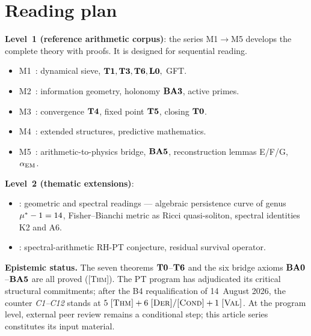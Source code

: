 \section{Reading plan}
\label{sec:plan}

\textbf{Level~1 (reference arithmetic corpus)}: the series M1$\to$M5 develops the complete theory with proofs. It is designed for sequential reading.
\begin{itemize}[nosep,leftmargin=*]
\item M1~\cite{companion_M1}: dynamical sieve, $\textbf{T1}, \textbf{T3}, \textbf{T6}, \textbf{L0},$ GFT.
\item M2~\cite{companion_M2}: information geometry, holonomy $\textbf{BA3}$, active primes.
\item M3~\cite{companion_M3}: convergence $\textbf{T4}$, fixed point $\textbf{T5}$, closing $\textbf{T0}$.
\item M4~\cite{companion_M4}: extended structures, predictive mathematics.
\item M5~\cite{companion_M5}: arithmetic-to-physics bridge, $\textbf{BA5}$, reconstruction lemmas E/F/G, $\alpha_{\rm EM}$.
\end{itemize}

\textbf{Level~2 (thematic extensions)}:
\begin{itemize}[nosep,leftmargin=*]
\item \cite{PT_GeoSpectral}: geometric and spectral readings --- algebraic persistence curve of genus $\mu^{*} - 1 = 14$, Fisher--Bianchi metric as Ricci quasi-soliton, spectral identities K2 and A6.
\item \cite{PT_RH}: spectral-arithmetic RH-PT conjecture, residual survival operator.
\end{itemize}

\textbf{Epistemic status.} The seven theorems $\textbf{T0}$--$\textbf{T6}$ and the six bridge axioms $\textbf{BA0}$--$\textbf{BA5}$ are all proved (\textsc{[Thm]}). The PT program has adjudicated its critical structural commitments; after the B4 requalification of 14~August 2026, the counter \emph{C1--C12} stands at $5\;\textsc{[Thm]} + 6\;\textsc{[Der]}/\textsc{[Cond]} + 1\;\textsc{[Val]}$. At the program level, external peer review remains a conditional step; this article series constitutes its input material.

\printbibliography


